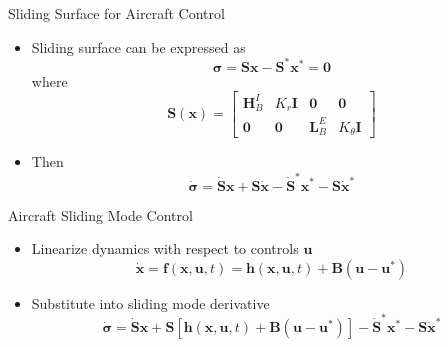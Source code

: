 \documentclass[aspectratio=169]{beamer}
\begin{document}
\begin{frame}{Sliding Surface for Aircraft Control}
    \begin{itemize}
        \item Sliding surface can be expressed as
        \begin{equation*}
            \boldsymbol{\sigma} = \mathbf{S}\mathbf{x} - \mathbf{S}^*\mathbf{x}^* = \mathbf{0}
        \end{equation*}
        where
        \begin{equation*}
            \mathbf{S}(\mathbf{x}) = \begin{bmatrix}
                \mathbf{H}_B^I & K_r\mathbf{I} & \mathbf{0} & \mathbf{0} \\
                \mathbf{0} & \mathbf{0} & \mathbf{L}_B^E & K_\theta\mathbf{I}
            \end{bmatrix}
        \end{equation*}
        \item Then
        \begin{equation*}
            \dot{\boldsymbol{\sigma}} = \dot{\mathbf{S}}\mathbf{x} + \mathbf{S}\dot{\mathbf{x}} - \dot{\mathbf{S}}^*\mathbf{x}^* - \mathbf{S}\dot{\mathbf{x}}^*
        \end{equation*}
    \end{itemize}
\end{frame}

\begin{frame}{Aircraft Sliding Mode Control}
    \begin{itemize}
        \item Linearize dynamics with respect to controls $\mathbf{u}$
        \begin{equation*}
            \dot{\mathbf{x}} = \mathbf{f}(\mathbf{x},\mathbf{u},t) = \mathbf{h}(\mathbf{x},\mathbf{u},t) + \mathbf{B} (\mathbf{u} - \mathbf{u}^*)
        \end{equation*}
        \item Substitute into sliding mode derivative
        \begin{equation*}
            \dot{\boldsymbol{\sigma}} = \dot{\mathbf{S}}\mathbf{x} + \mathbf{S}[\mathbf{h}(\mathbf{x},\mathbf{u},t) + \mathbf{B} (\mathbf{u} - \mathbf{u}^*)] - \dot{\mathbf{S}}^*\mathbf{x}^* - \mathbf{S}\dot{\mathbf{x}}^*
        \end{equation*}
    \end{itemize}
\end{frame}
\end{document}
